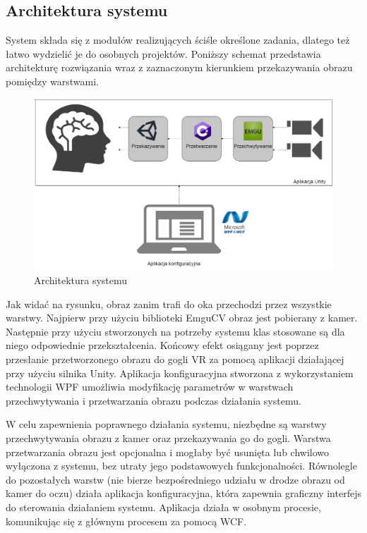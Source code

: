 \documentclass[a4paper,11pt,twoside]{report}
\theoremstyle{definition}
\begin{document}
\subsection{Architektura systemu}

System składa się z modułów realizujących ściśle określone zadania, dlatego też łatwo wydzielić je do osobnych projektów. Poniższy schemat przedstawia architekturę rozwiązania wraz z zaznaczonym kierunkiem przekazywania obrazu pomiędzy warstwami. 

\begin{figure}[h]
\centering
\includegraphics[scale=0.3]{images/architecture_schema}
\caption[Architektura systemu]{Architektura systemu}
\end{figure}

Jak widać na rysunku, obraz zanim trafi do oka przechodzi przez wszystkie warstwy. Najpierw przy użyciu biblioteki EmguCV obraz jest pobierany z kamer. Następnie przy użyciu stworzonych na potrzeby systemu klas stosowane są dla niego odpowiednie przekształcenia. Końcowy efekt osiągany jest poprzez przesłanie przetworzonego obrazu do gogli VR za pomocą aplikacji działającej przy użyciu silnika Unity. Aplikacja konfiguracyjna stworzona z wykorzystaniem technologii WPF umożliwia modyfikację parametrów w warstwach przechwytywania i przetwarzania obrazu podczas działania systemu. 

W celu zapewnienia poprawnego działania systemu, niezbędne są warstwy przechwytywania obrazu z kamer oraz przekazywania go do gogli. Warstwa przetwarzania obrazu jest opcjonalna i mogłaby być usunięta lub chwilowo wyłączona z systemu, bez utraty jego podstawowych funkcjonalności. Równolegle do pozostałych warstw (nie bierze bezpośredniego udziału w drodze obrazu od kamer do oczu) działa  aplikacja konfiguracyjna, która zapewnia graficzny interfejs do sterowania działaniem systemu. Aplikacja działa w osobnym procesie, komunikując się z głównym procesem za pomocą WCF.
\end{document}

